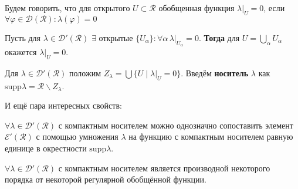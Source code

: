 Будем говорить, что для открытого $U \subset \mathcal{R}$ обобщенная функция $\lambda\big|_U = 0$, если $\forall \varphi \in \mathcal{D}(\mathcal{R})\colon \lambda(\varphi) = 0$

\begin{to_lem}
	Пусть для $\lambda \in \mathcal{D}'(\mathcal{R})$ $\exists$ открытые $\{U_\alpha\} \colon \forall \alpha \, \lambda\big|_{U_\alpha} = 0$. \textbf{Тогда} для $U = \bigcup_\alpha U_\alpha$ окажется $\lambda\big|_U = 0$.
\end{to_lem}

\begin{to_def}
	Для $\lambda \in \mathcal{D}'(\mathcal{R})$ положим $Z_\lambda = \bigcup \{U \mid \lambda\big|_U = 0\}$. Введём \textbf{носитель}  $\lambda$ как $\text{supp} \lambda = \mathcal{R} \backslash Z_\lambda$.
\end{to_def}

И ещё пара интересных свойств:
\begin{to_lem}
	$\forall \lambda \in \mathcal{D}'(\mathcal{R})$ с компактным носителем можно однозначно сопоставить элемент $\mathcal{E}'(\mathcal{R})$ с помощью умножения $\lambda$ на функцию с компактным носителем равную единице в окрестности $\text{supp}\lambda$.
\end{to_lem}

\begin{to_thr}
	$\forall \lambda \in \mathcal{D}'(\mathcal{R})$ с компактным носителем является производной некоторого порядка от некоторой регулярной обобщённой функции.
\end{to_thr}